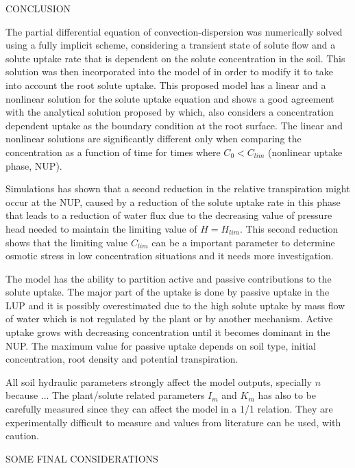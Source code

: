 \cleardoublepage
\chap CONCLUSION

The partial differential equation of convection-dispersion was numerically solved using a fully implicit scheme, considering a transient state of solute flow and a solute uptake rate that is dependent on the solute concentration in the soil.
This solution was then incorporated into the model of \citeonline[liersolute] in order to modify it to take into account the root solute uptake.
This proposed model has a linear and a nonlinear solution for the solute uptake equation and shows a good agreement with the analytical solution proposed by \citeonline[cushman] which, also considers a concentration dependent uptake as the boundary condition at the root surface.
The linear and nonlinear solutions are significantly different only when comparing the concentration as a function of time for times where $C_0 < C_{lim}$ (nonlinear uptake phase, NUP).

Simulations has shown that a second reduction in the relative transpiration might occur at the NUP, caused by a reduction of the solute uptake rate in this phase that leads to a reduction of water flux due to the decreasing value of pressure head needed to maintain the limiting value of $H=H_{lim}$.
{\tred This second reduction shows that the limiting value $C_{lim}$ can be a important parameter to determine osmotic stress in low concentration situations and it needs more investigation.}

The model has the ability to partition active and passive contributions to the solute uptake.
The major part of the uptake is done by passive uptake in the LUP and it is possibly overestimated due to the high solute uptake by mass flow of water which is not regulated by the plant or by another mechanism. 
Active uptake grows with decreasing concentration until it becomes dominant in the NUP.
The maximum value for passive uptake depends on soil type, initial concentration, root density and potential transpiration.

All soil hydraulic parameters strongly affect the model outputs, specially $n$ because ...
The plant/solute related parameters $I_m$ and $K_m$ has also to be carefully measured since they can affect the model in a 1/1 relation.
They are experimentally difficult to measure and values from literature can be used, with caution.

SOME FINAL CONSIDERATIONS

